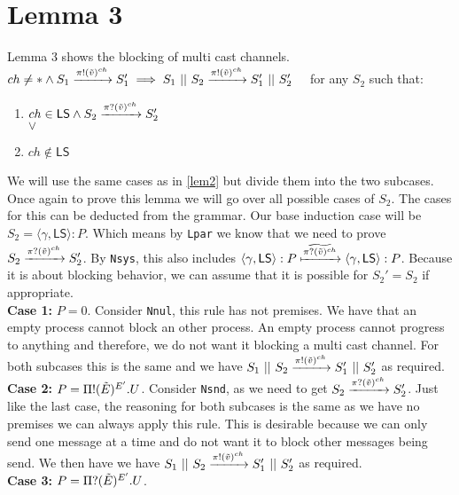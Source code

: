 \section{Lemma 3}
\begin{lemma}
    Lemma 3 shows the blocking of multi cast channels.\\
$ch\not = * \land S_1 \xrightarrow[]{\pi !(\Tilde{v})^{ch}}S_1' \implies S_1\ ||\ S_2 \xrightarrow[]{\pi !(\Tilde{v})^{ch}}S_1'\ ||\ S_2'\quad$ for any $S_2$ such that:
\begin{enumerate}
    \item $ch \in \mathsf{LS} \land S_2 \xrightarrow[]{\pi ?(\Tilde{v})^{ch}}S_2'$\\
    $\lor$
    \item $ch \not \in \mathsf{LS}$
\end{enumerate}
\end{lemma}
We will use the same cases as in \ref{lem2} but divide them into the two subcases. Once again to prove this lemma we will go over all possible cases of $S_2$. The cases for this can be deducted from the grammar. Our base induction case will be $S_2=\langle \gamma, \mathsf{LS}\rangle : P$. Which means by \texttt{Lpar} we know that we need to prove $S_2 \xrightarrow[]{\pi ?(\Tilde{v})^{ch}}S_2'$. By \texttt{Nsys}, this also includes $\langle \gamma, \mathsf{LS}\rangle : P \xmapsto[]{\widetilde{\pi ?(\Tilde{v})^{ch}}}\langle \gamma, \mathsf{LS}\rangle : P$. Because it is about blocking behavior, we can assume that it is possible for $S_2'=S_2$ if appropriate.\\
\textbf{Case 1: } $P=0$. Consider \texttt{Nnul}, this rule has not premises. We have that an empty process cannot block an other process. An empty process cannot progress to anything and therefore, we do not want it blocking a multi cast channel. For both subcases this is the same and we have $S_1\ ||\ S_2 \xrightarrow[]{\pi !(\Tilde{v})^{ch}}S_1'\ ||\ S_2'$ as required.\\
\textbf{Case 2: } $P=\Pi ! (\Tilde{E})^{E'}.U$. Consider \texttt{Nsnd}, as we need to get $S_2 \xrightarrow[]{\pi ?(\Tilde{v})^{ch}} S_2'$. Just like the last case, the reasoning for both subcases is the same as we have no premises we can always apply this rule. This is desirable because we can only send one message at a time and do not want it to block other messages being send. We then have we have $S_1\ ||\ S_2 \xrightarrow[]{\pi !(\Tilde{v})^{ch}}S_1'\ ||\ S_2'$ as required.\\
\textbf{Case 3: } $P=\Pi ? (\Tilde{E})^{E'}.U$.\\
